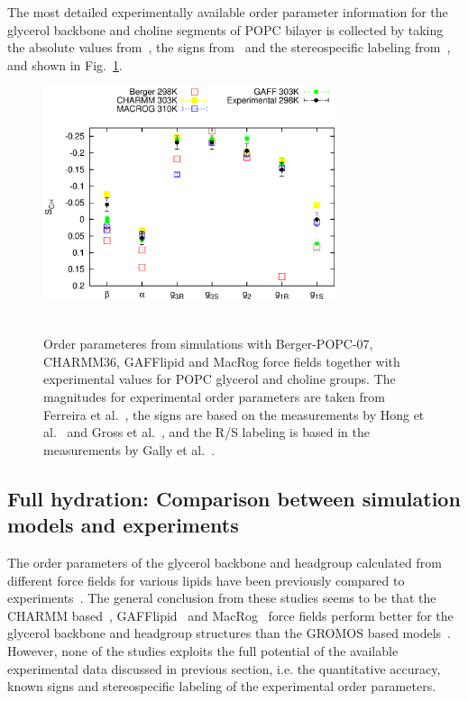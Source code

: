 \documentclass[journal=jacsat,manuscript=article]{achemso}
\begin{document}
The most detailed experimentally available order parameter information for the glycerol backbone and choline 
segments of POPC bilayer is collected by taking the absolute values from~\cite{ferreira13}, the signs from~\cite{hong95a,hong95b,gross97} 
and the stereospecific labeling from~\cite{gally81}, and shown in Fig.~\ref{HGorderparameters2}.
\begin{figure}[]
  \centering
  \includegraphics[width=8.6cm]{HGorderparameters5.eps} \\
   \\
  \caption{\label{HGorderparameters2}
  Order parameteres from simulations with Berger-POPC-07, CHARMM36, GAFFlipid and MacRog force fields together with experimental values for POPC glycerol and choline groups.
  The magnitudes for experimental order parameters are taken from Ferreira et al.~\cite{ferreira13}, the signs are based on the measurements by Hong et al.~\cite{hong95a,hong95b} 
  and Gross et al.~\cite{gross97}, and the R/S labeling is based in the measurements by Gally et al.~\cite{gally81}.
} 
\end{figure}

\subsection{Full hydration: Comparison between simulation models and experiments}

The order parameters of the glycerol backbone and headgroup calculated from different force fields for various lipids have been 
previously compared to experiments~\cite{shinoda97,hogberg08,castro08,klauda10,kapla12,dickson12,poger12,ferreira13,chowdhary13,maciejewski14}. 
The general conclusion from these studies seems to be that the CHARMM based~\cite{hogberg08,klauda10}, GAFFlipid~\cite{dickson12} and
MacRog~\cite{maciejewski14} force fields perform better for the glycerol backbone and headgroup structures than the GROMOS based models~\cite{castro08,kapla12,poger12,ferreira13}.
However, none of the studies exploits the full potential of the available experimental data discussed in previous section, i.e. the quantitative accuracy, known signs and stereospecific labeling of
the experimental order parameters.
\end{document}
